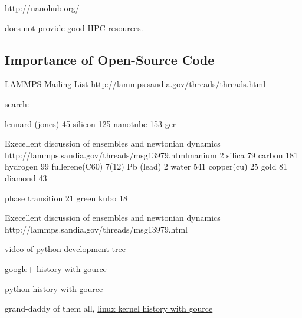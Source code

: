 http://nanohub.org/

does not provide good HPC resources. 


\subsection{Importance of Open-Source Code}

LAMMPS Mailing List
http://lammps.sandia.gov/threads/threads.html

search: 

lennard (jones)	45
silicon		125
nanotube	153
ger


Execellent discussion of ensembles and newtonian dynamics
http://lammps.sandia.gov/threads/msg13979.htmlmanium	2
silica		79
carbon		181
hydrogen	99
fullerene(C60)	7(12)	
Pb (lead)	2
water		541
copper(cu)	25
gold		81
diamond		43

phase transition	21
green kubo	18


Execellent discussion of ensembles and newtonian dynamics
http://lammps.sandia.gov/threads/msg13979.html

video of python development tree

\href{http://www.youtube.com/watch?v=3poNeQHUKrs}
{google+ history with gource}

\href{http://www.youtube.com/watch?v=cNBtDstOTmA}
{python history with gource}

grand-daddy of them all, 
\href{http://www.youtube.com/watch?v=pOSqctHH9vY}
{linux kernel history with gource}



